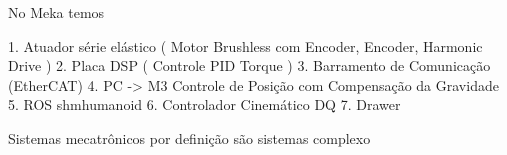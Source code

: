 No Meka temos

1. Atuador série elástico ( Motor Brushless com Encoder, Encoder, Harmonic Drive )
2. Placa DSP ( Controle PID Torque )
3. Barramento de Comunicação (EtherCAT)
4. PC -> M3 Controle de Posição com Compensação da Gravidade
5. ROS shmhumanoid
6. Controlador Cinemático DQ
7. Drawer

Sistemas mecatrônicos por definição são sistemas complexo



